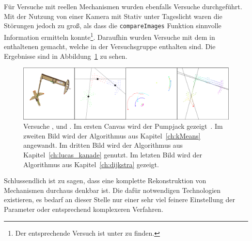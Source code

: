 Für Versuche mit reellen Mechanismen wurden ebenfalls Versuche durchgeführt.
Mit der Nutzung von einer Kamera mit Stativ unter Tageslicht waren die Störungen jedoch zu gro{\ss}, als dass die \lstinline{compareImages} Funktion sinnvolle Information ermitteln konnte\footnote{Der entsprechende Versuch ist unter  zu finden.}.
Daraufhin wurden Versuche mit dem in ~\cite{Uhlig2019} enthaltenen  gemacht, welche in der Versuchsgruppe  enthalten sind.
Die Ergebnisse sind in Abbildung~\ref{fig:bilder2} zu sehen.

\begin{figure}
    \centering
    \includegraphics[width=\textwidth]{gfx/bilder2_edited.png}
    \caption[Versuche ,  und ]{Versuche ,  und . Im ersten Canvas wird der Pumpjack gezeigt~\cite{Uhlig2021}. Im zweiten Bild wird der  Algorithmus aus Kapitel~\ref{ch:kMeans} angewandt. Im dritten Bild wird der  Algorithmus aus Kapitel~\ref{ch:lucas_kanade} genutzt. Im letzten Bild wird der  Algorithmus aus Kapitel~\ref{ch:dijkstra} gezeigt.}
    \label{fig:bilder2}
\end{figure}

Schlussendlich ist zu sagen, dass eine komplette Rekonstruktion von Mechanismen durchaus denkbar ist.
Die dafür notwendigen Technologien existieren, es bedarf an dieser Stelle nur einer sehr viel feinere Einstellung der Parameter oder entsprechend komplexeren Verfahren.
